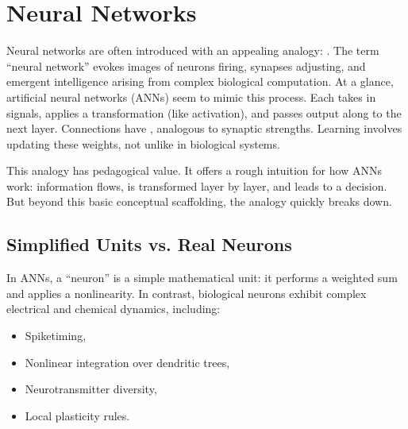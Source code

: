 \documentclass[letterpaper,10pt,english]{jupyterBook}
\begin{document}
\chapter{Neural Networks}
\label{\detokenize{neuralnets:neural-networks}}\label{\detokenize{neuralnets::doc}}
\sphinxAtStartPar
Neural networks are often introduced with an appealing analogy: . The term “neural network” evokes images of neurons firing, synapses adjusting, and emergent intelligence arising from complex biological computation. At a glance, artificial neural networks (ANNs) seem to mimic this process. Each  takes in signals, applies a transformation (like activation), and passes output along to the next layer. Connections have , analogous to synaptic strengths. Learning involves updating these weights, not unlike  in biological systems.

\sphinxAtStartPar
This analogy has pedagogical value. It offers a rough intuition for how ANNs work: information flows, is transformed layer by layer, and leads to a decision. But beyond this basic conceptual scaffolding, the analogy quickly breaks down. 


\section{Simplified Units vs. Real Neurons}
\label{\detokenize{neuralnets:simplified-units-vs-real-neurons}}
\sphinxAtStartPar
In ANNs, a “neuron” is a simple mathematical unit: it performs a weighted sum and applies a nonlinearity. In contrast, biological neurons exhibit complex electrical and chemical dynamics, including:
\begin{itemize}
\item {} 
\sphinxAtStartPar
Spike\sphinxhyphen{}timing,

\item {} 
\sphinxAtStartPar
Nonlinear integration over dendritic trees,

\item {} 
\sphinxAtStartPar
Neurotransmitter diversity,

\item {} 
\sphinxAtStartPar
Local plasticity rules.

\end{itemize}
\end{document}
